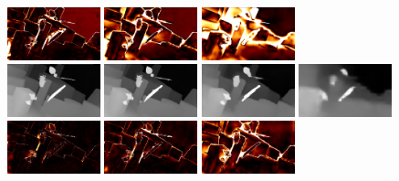 \documentclass[runningheads]{llncs}
\begin{document}
\begin{figure}
\begin{center}
        \includegraphics[width=0.24\textwidth,height=0.08\textwidth,clip]{figures/pred_1_err.png}
        \includegraphics[width=0.24\textwidth,height=0.08\textwidth,clip]{figures/pred_2_err.png}
        \includegraphics[width=0.24\textwidth,height=0.08\textwidth,clip]{figures/pred_3_err.png}
        \\
        \includegraphics[width=0.24\textwidth,height=0.08\textwidth,clip]{figures/pred_comb_0.png}
        \includegraphics[width=0.24\textwidth,height=0.08\textwidth,clip]{figures/pred_comb_1.png}
        \includegraphics[width=0.24\textwidth,height=0.08\textwidth,clip]{figures/pred_comb_2.png}
        \includegraphics[width=0.24\textwidth,height=0.08\textwidth,clip]{figures/pred_comb_3.png}
        \\
        \includegraphics[width=0.24\textwidth,height=0.08\textwidth,clip]{figures/pred_comb_0_err.png}
        \includegraphics[width=0.24\textwidth,height=0.08\textwidth,clip]{figures/pred_comb_1_err.png}
        \includegraphics[width=0.24\textwidth,height=0.08\textwidth,clip]{figures/pred_comb_2_err.png}

\end{center}
\end{figure}
\end{document}
